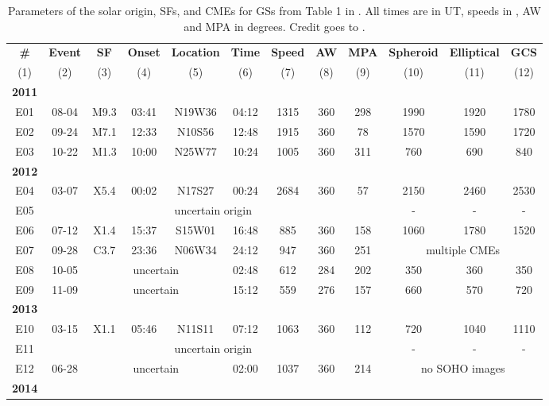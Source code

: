 \begin{table}[htp]
	\tiny
	\caption{Parameters of the solar origin, SFs, and CMEs for GSs from Table 1 in \citet{miteva_2023}. All times are in UT, speeds in \kms, AW and MPA in degrees. Credit goes to \citet{miteva_2023}.}
	\label{tab_GS_sol}
	\begin{adjustbox}{width=\textwidth}
		\begin{tabular}{@{}cccccccccccc@{}}
			\toprule
			\textbf{\#} & \textbf{Event} & \textbf{SF} & \textbf{Onset} & \textbf{Location} & \textbf{Time} & \textbf{Speed} & \textbf{AW} & \textbf{MPA} & \textbf{Spheroid} & \textbf{Elliptical} & \textbf{GCS} \\
			(1) & (2) & (3) & (4) & (5) & (6) & (7) & (8) & (9) & (10) & (11) & (12) \\
			\midrule
			\textbf{2011}\\
			E01 & 08-04 & M9.3 & 03:41 & N19W36 & 04:12 & 1315 & 360 & 298 & 1990 & 1920 & 1780 \\
			E02 & 09-24 & M7.1 & 12:33 & N10S56 & 12:48 & 1915 & 360 & 78 & 1570 & 1590 & 1720 \\
			E03 & 10-22 & M1.3 & 10:00 & N25W77 & 10:24 & 1005 & 360 & 311 & 760 & 690 & 840 \\
			\textbf{2012} \\
			E04 & 03-07 & X5.4 & 00:02 & N17S27 & 00:24 & 2684 & 360 & 57 & 2150 & 2460 & 2530 \\
			E05 & \multicolumn{8}{c}{uncertain origin} & - & - & -\\
			E06 & 07-12 & X1.4 & 15:37 & S15W01 & 16:48 & 885 & 360 & 158 & 1060 & 1780 & 1520 \\
			E07 & 09-28 & C3.7 & 23:36 & N06W34 & 24:12 & 947 & 360 & 251 & \multicolumn{3}{c}{multiple CMEs}\\
			E08 & 10-05 & \multicolumn{3}{c}{uncertain} & 02:48 & 612 & 284 & 202 & 350 & 360 & 350 \\
			E09 & 11-09 & \multicolumn{3}{c}{uncertain} & 15:12 & 559 & 276 & 157 & 660 & 570 & 720 \\
			\textbf{2013}\\
			E10 & 03-15 & X1.1 & 05:46 & N11S11 & 07:12 & 1063 & 360 & 112 & 720 & 1040 & 1110 \\
			E11 & \multicolumn{8}{c}{uncertain origin} & - & - & -\\
			E12 & 06-28 & \multicolumn{3}{c}{uncertain} & 02:00 & 1037 & 360 & 214 & \multicolumn{3}{c}{no SOHO images}\\
			\textbf{2014} \\

\end{tabular}
\end{adjustbox}
\end{table}
